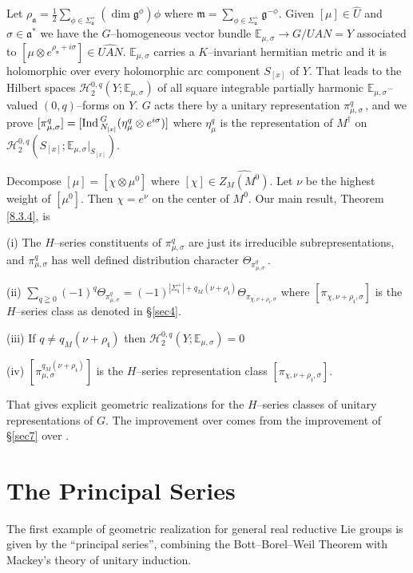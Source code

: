 \documentclass{conm-p-l}
\renewcommand{\gg}{\mathfrak{g}}
\def\ga{\mathfrak{a}}
\def\gg{\mathfrak{g}}
\def\gm{\mathfrak{m}}
\def\gt{\mathfrak{t}}
\def\Ind{{\rm Ind\,}}
\def\E{\mathbb{E}}
\def\cH{\mathcal{H}}
\begin{document}
Let $\rho_\ga = \frac{1}{2}\sum_{\phi \in \Sigma_\ga^+} (\dim \gg^\phi)\phi$
where $\gm = \sum_{\phi \in \Sigma_\ga^+} \gg^{-\phi}$.  Given $[\mu] \in
\widehat{U}$ and $\sigma \in \ga^*$ we have the $G$--homogeneous vector
bundle $\E_{\mu,\sigma} \to G/UAN = Y$ associated to 
$[\mu \otimes e^{\rho_\ga + i\sigma}] \in \widehat{UAN}$.  $\E_{\mu,\sigma}$
carries a $K$--invariant hermitian metric and it is holomorphic over every
holomorphic arc component $S_{[x]}$ of $Y$.  That leads to the Hilbert spaces
$\cH_2^{0,q}(Y;\E_{\mu,\sigma})$ of all square integrable partially harmonic
$\E_{\mu,\sigma}$--valued $(0,q)$--forms on $Y$.  $G$ acts there by a unitary
representation $\pi_{\mu,\sigma}^q$\,, and we prove $[\pi_{\mu,\sigma}^q]
= [\Ind_{N_{[x]}}^{G} (\eta_\mu^q \otimes e^{i\sigma})]$ where $\eta_\mu^q$
is the representation of $M^\dagger$ on 
$\cH_2^{0,q}(S_{[x]};\E_{\mu,\sigma}|_{S_{[x]}})$.

Decompose $[\mu] = [\chi \otimes \mu^0]$ where $[\chi] \in \widehat{Z_M(M^0)}$.
Let $\nu$ be the highest weight of $[\mu^0]$.  Then $\chi = e^\nu$ on the
center of $M^0$.  Our main result, Theorem \ref{8.3.4}, is
\medskip
{\em

(i) The $H$--series constituents of $\pi_{\mu,\sigma}^q$ are just its 
irreducible subrepresentations, and $\pi_{\mu,\sigma}^q$
has well defined distribution character $\Theta_{{\pi_{\mu,\sigma}^q}}$\,.
\smallskip

(ii) $\sum_{q \geqq 0} (-1)^q \Theta_{{\pi_{\mu,\sigma}^q}} =
	(-1)^{|\Sigma_\gt ^+|+q_M(\nu + \rho_\gt)}
	\Theta_{\pi_{\chi, \nu+\rho_\gt ,\sigma}}$
where $[\pi_{\chi, \nu+\rho_\gt ,\sigma}]$ is the $H$--series class as
denoted in \S \ref{sec4}.
\smallskip

(iii) If $q \ne q_M(\nu + \rho_\gt)$ then $\cH_2^{0,q}(Y; \E_{\mu,\sigma}) = 0$
\smallskip

(iv) $[\pi_{\mu,\sigma}^{q_M(\nu + \rho_\gt)}]$ is the $H$--series
representation class $[\pi_{\chi,\nu+\rho_\gt,\sigma}]$.
}
\medskip

\noindent
That gives explicit geometric realizations for the $H$--series classes of
unitary representations of $G$.  The improvement over \cite[\S 8]{W1973}
comes from the improvement of \S \ref{sec7} over \cite[\S 7]{W1973}.

\section{The Principal Series}\label{sec1}
\setcounter{equation}{0}
The first example of geometric realization for general real reductive 
Lie groups is given by the
``principal series'', combining the Bott--Borel--Weil Theorem with Mackey's
theory of unitary induction.  
\end{document}
